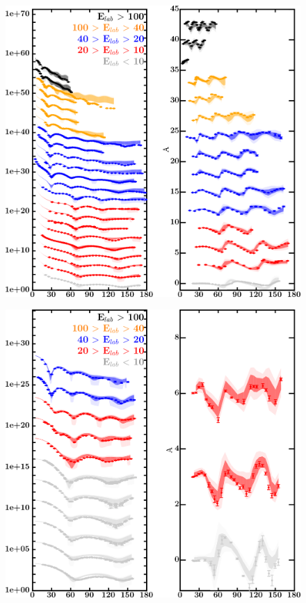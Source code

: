 \documentclass[twocolumn,secnumarabic,amssymb, nobibnotes, aps, prl,
superscriptaddress, nobalancelastpage]{revtex4}
\begin{document}
\begin{figure}[!htb]
    \centering
    \begin{minipage}{0.4\linewidth}
        \centering
        \includegraphics[width=\linewidth]{figures/ni58_protonElastic.png}
        \label{DOM_ni58_proton_elastic}
    \end{minipage}\hspace{6pt}
    \begin{minipage}{0.4\linewidth}
        \centering
        \includegraphics[width=\linewidth]{figures/ni58_neutronElastic.png}

\end{minipage}
\end{figure}
\end{document}

